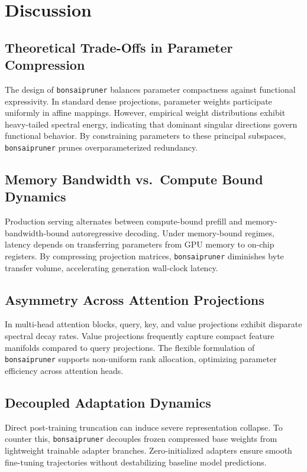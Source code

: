 \section{Discussion}

\subsection{Theoretical Trade-Offs in Parameter Compression}
The design of \texttt{bonsaipruner} balances parameter compactness against functional expressivity. In standard dense projections, parameter weights participate uniformly in affine mappings. However, empirical weight distributions exhibit heavy-tailed spectral energy, indicating that dominant singular directions govern functional behavior. By constraining parameters to these principal subspaces, \texttt{bonsaipruner} prunes overparameterized redundancy.

\subsection{Memory Bandwidth vs.\ Compute Bound Dynamics}
Production serving alternates between compute-bound prefill and memory-bandwidth-bound autoregressive decoding. Under memory-bound regimes, latency depends on transferring parameters from GPU memory to on-chip registers. By compressing projection matrices, \texttt{bonsaipruner} diminishes byte transfer volume, accelerating generation wall-clock latency.

\subsection{Asymmetry Across Attention Projections}
In multi-head attention blocks, query, key, and value projections exhibit disparate spectral decay rates. Value projections frequently capture compact feature manifolds compared to query projections. The flexible formulation of \texttt{bonsaipruner} supports non-uniform rank allocation, optimizing parameter efficiency across attention heads.

\subsection{Decoupled Adaptation Dynamics}
Direct post-training truncation can induce severe representation collapse. To counter this, \texttt{bonsaipruner} decouples frozen compressed base weights from lightweight trainable adapter branches. Zero-initialized adapters ensure smooth fine-tuning trajectories without destabilizing baseline model predictions.

